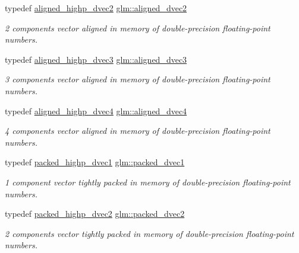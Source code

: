 \begin{DoxyCompactItemize}
typedef \mbox{\hyperlink{group__gtc__type__aligned_gadc0edec95aa740d8ec351ef1e2dd39de}{aligned\+\_\+highp\+\_\+dvec2}} \mbox{\hyperlink{group__gtc__type__aligned_ga1e6972e837bc34b3424af8d63a71d7c6}{glm\+::aligned\+\_\+dvec2}}
\begin{DoxyCompactList}\small\item\em 2 components vector aligned in memory of double-\/precision floating-\/point numbers. \end{DoxyCompactList}\item 
typedef \mbox{\hyperlink{group__gtc__type__aligned_gafb21f8db25007665c2cb2a9b250471aa}{aligned\+\_\+highp\+\_\+dvec3}} \mbox{\hyperlink{group__gtc__type__aligned_ga82da11893fbac3bda647c9de9da62693}{glm\+::aligned\+\_\+dvec3}}
\begin{DoxyCompactList}\small\item\em 3 components vector aligned in memory of double-\/precision floating-\/point numbers. \end{DoxyCompactList}\item 
typedef \mbox{\hyperlink{group__gtc__type__aligned_ga4b7b03b9178c6f0574c26181a054beec}{aligned\+\_\+highp\+\_\+dvec4}} \mbox{\hyperlink{group__gtc__type__aligned_ga502d8d084a488118c9a5466d73ba1a46}{glm\+::aligned\+\_\+dvec4}}
\begin{DoxyCompactList}\small\item\em 4 components vector aligned in memory of double-\/precision floating-\/point numbers. \end{DoxyCompactList}\item 
typedef \mbox{\hyperlink{group__gtc__type__aligned_ga28333ae58dc1ce6fdf75a8dba0065603}{packed\+\_\+highp\+\_\+dvec1}} \mbox{\hyperlink{group__gtc__type__aligned_ga1b85bcaa9f7caaec77f3a31d35669a98}{glm\+::packed\+\_\+dvec1}}
\begin{DoxyCompactList}\small\item\em 1 component vector tightly packed in memory of double-\/precision floating-\/point numbers. \end{DoxyCompactList}\item 
typedef \mbox{\hyperlink{group__gtc__type__aligned_ga8c26414d99b8996aa7dc73e1dc8a06bd}{packed\+\_\+highp\+\_\+dvec2}} \mbox{\hyperlink{group__gtc__type__aligned_ga88996e3df7350600759c8006ffcb7782}{glm\+::packed\+\_\+dvec2}}
\begin{DoxyCompactList}\small\item\em 2 components vector tightly packed in memory of double-\/precision floating-\/point numbers. \end{DoxyCompactList}\item 

\end{DoxyCompactItemize}
